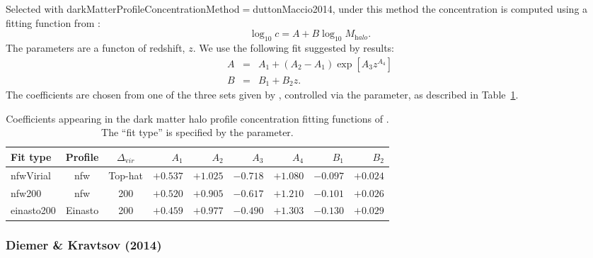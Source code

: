 Selected with {\normalfont \ttfamily darkMatterProfileConcentrationMethod}$=${\normalfont \ttfamily duttonMaccio2014}, under this method the concentration is computed using a fitting function from \cite{dutton_cold_2014}:
\begin{equation}
\log_{10} c = A + B \log_{10} M_{\mathrm halo}.
\end{equation}
The parameters are a functon of redshift, $z$. We use the following fit suggested by \cite{dutton_cold_2014} results:
\begin{eqnarray}
A &=& A_1+(A_2-A_1)\exp[A_3 z^{A_4}] \nonumber \\
B &=& B_1+B_2 z.
\end{eqnarray}
The coefficients are chosen from one of the three sets given by \cite{dutton_cold_2014}, controlled via the {\normalfont {}} parameter, as described in Table~\ref{tb:DuttonMaccioConcentrationCoefficients}.

\begin{table}
\begin{center}
\begin{tabular}{lccrrrrrr}
\hline
{\normalfont \bfseries Fit type} & {\normalfont \bfseries Profile} & {\boldmath $\Delta_{\mathrm vir}$ } & {\boldmath $A_1$} & {\boldmath $A_2$} & {\boldmath $A_3$} & {\boldmath $A_4$} & {\boldmath $B_1$} & {\boldmath $B_2$} \\
\hline
{\normalfont \ttfamily nfwVirial}  & \gls{nfw} & Top-hat & $+0.537$ & $+1.025$ & $-0.718$ & $+1.080$ & $-0.097$ & $+0.024$ \\
{\normalfont \ttfamily nfw200}     & \gls{nfw} & 200     & $+0.520$ & $+0.905$ & $-0.617$ & $+1.210$ & $-0.101$ & $+0.026$ \\
{\normalfont \ttfamily einasto200} & Einasto   & 200     & $+0.459$ & $+0.977$ & $-0.490$ & $+1.303$ & $-0.130$ & $+0.029$ \\
\hline
\end{tabular}
\end{center}
\caption{Coefficients appearing in the dark matter halo profile concentration fitting functions of \protect\cite{dutton_cold_2014}. The ``fit type'' is specified by the {\normalfont {}} parameter.}
\label{tb:DuttonMaccioConcentrationCoefficients}
\end{table}

\subsubsection{Diemer \& Kravtsov (2014)}\label{phys:darkMatterProfileConcentration:darkMatterProfileConcentrationDiemerKravtsov2014}

